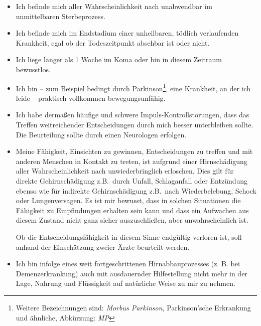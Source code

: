 \documentclass[pdftex,12pt,a4paper]{article}
\begin{document}
\begin{itemize}


\item	Ich befinde mich aller Wahrscheinlichkeit nach unabwendbar im unmittelbaren Sterbeprozess.


\item	Ich befinde mich im Endstadium einer unheilbaren, tödlich verlaufenden Krankheit, egal ob der Todeszeitpunkt absehbar ist oder nicht.


\item	Ich liege länger als 1 Woche im Koma oder bin in diesem Zeitraum bewusstlos.

\item	Ich bin -- zum Beispiel bedingt durch Parkinson\footnote{Weitere Bezeichnungen sind: \textit{Morbus Parkinson}, Parkinson'sche Erkrankung und ähnliche, Abkürzung: \textit{MP}}, eine Krankheit,
an der ich leide -- praktisch vollkommen bewegungsunfähig.


\item	Ich habe dermaßen häufige und schwere Impuls-Kontrollstörungen, dass
das Treffen weitreichender Entscheidungen durch mich besser unterbleiben sollte. Die
Beurteilung sollte durch einen Neurologen erfolgen.

\item	Meine Fähigkeit, Einsichten zu gewinnen, Entscheidungen zu treffen und mit anderen Menschen in Kontakt zu treten, ist aufgrund einer Hirnschädigung aller Wahrscheinlichkeit nach unwiederbringlich erloschen. Dies gilt für direkte Gehirnschädigung z.B.\ durch Unfall, Schlaganfall oder Entzündung ebenso wie für indirekte Gehirnschädigung z.B.\ nach Wiederbelebung, Schock oder Lungenversagen. Es ist mir bewusst, dass in solchen Situationen die Fähigkeit zu Empfindungen erhalten sein kann und dass ein Aufwachen aus diesem Zustand nicht ganz sicher auszuschließen, aber unwahrscheinlich ist.

 Ob die Entscheidungsfähigkeit in diesem Sinne endgültig verloren ist, soll anhand der Einschätzung zweier Ärzte beurteilt werden.


\item	Ich bin infolge eines weit fortgeschrittenen Hirnabbauprozesses
(z. B. bei Demenzerkrankung) auch mit ausdauernder Hilfestellung
nicht mehr in der Lage, Nahrung und Flüssigkeit auf natürliche Weise zu mir zu nehmen.

 
 
\end{itemize}
 
 
 
\end{document}
